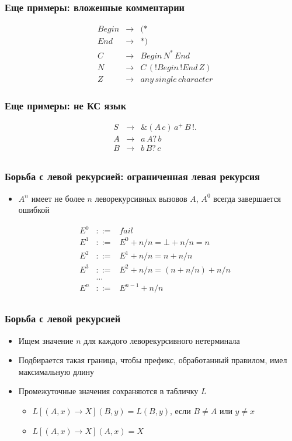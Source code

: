 \documentclass{beamer}
\begin{document}
\begin{frame}[fragile]
  \transwipe[direction=90]
  \frametitle{Еще примеры: вложенные комментарии}
  $$
  \begin{array}{crcl}
  &Begin & \rightarrow & (* \\
  &End & \rightarrow & *) \\
  &C& \rightarrow & Begin \, N^* \, End \\
  &N& \rightarrow & C \, (!Begin \, !End \, Z)\\
  &Z& \rightarrow & any \, single \, character
  \end{array}
  $$ 
\end{frame}

\begin{frame}[fragile]
  \transwipe[direction=90]
  \frametitle{Еще примеры: не КС язык}
  $$
  \begin{array}{crcl}
  &S & \rightarrow & \& (A \, c) \, a^+ \, B \, !. \\
  &A & \rightarrow & a \, A? \, b \\
  &B & \rightarrow & b \, B? \, c \\
  \end{array}
  $$ 
\end{frame}

\begin{frame}[fragile]
  \transwipe[direction=90]
  \frametitle{Борьба с левой рекурсией: ограниченная левая рекурсия}
\begin{itemize}
  \item $A^n$ имеет не более $n$ леворекурсивных вызовов $A$, $A^0$ всегда 
завершается ошибкой
\end{itemize}
$$
\begin{array}{crcl}
&E^0 & ::= & fail \\ 
&E^1 & ::= & E^0 + n / n = \bot + n / n = n \\
&E^2 & ::= & E^1 + n / n = n + n / n \\
&E^3 & ::= & E^2 + n / n = (n + n / n) + n / n\\
& & \dots &  \\
&E^n & ::= & E^{n-1} + n / n \\
\end{array}
$$ 
\end{frame}

\begin{frame}[fragile]
  \transwipe[direction=90]
  \frametitle{Борьба с левой рекурсией}
\begin{itemize}
  \item Ищем значение $n$ для каждого леворекурсивного нетерминала
  \item Подбирается такая граница, чтобы префикс, обработанный правилом, имел 
максимальную длину
  \item Промежуточные значения сохраняются в табличку $L$
  \begin{itemize}
    \item $L[(A, x) \rightarrow X](B, y) = L(B, y)$, если $B \neq A$ или $y 
\neq x$
    \item $L[(A, x) \rightarrow X](A, x) = X$
  \end{itemize}
\end{itemize}
\end{frame}
\end{document}
